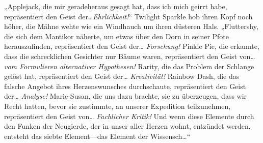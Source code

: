 „Applejack, die mir geradeheraus gesagt hat, dass ich mich geirrt habe, repräsentiert den Geist der…\emph{Ehrlichkeit!}“ Twilight Sparkle hob ihren Kopf noch höher, die Mähne wehte wie ein Windhauch um ihren düsteren Hals. „Fluttershy, die sich dem Mantikor näherte, um etwas über den Dorn in seiner Pfote herauszufinden, repräsentiert den Geist der… \emph{Forschung!} Pinkie Pie, die erkannte, dass die schrecklichen Gesichter nur Bäume waren, repräsentiert den Geist von… \emph{vom Formulieren alternativer Hypothesen!} Rarity, die das Problem der Schlange gelöst hat, repräsentiert den Geist der… \emph{Kreativität!} Rainbow Dash, die das falsche Angebot ihres Herzenswunsches durchschaute, repräsentiert den Geist der… \emph{Analyse!} Marie-Susan, die uns dazu brachte, sie zu überzeugen, dass wir Recht hatten, bevor sie zustimmte, an unserer Expedition teilzunehmen, repräsentiert den Geist von… \emph{Fachlicher Kritik!} Und wenn diese Elemente durch den Funken der Neugierde, der in unser aller Herzen wohnt, entzündet werden, entsteht das siebte Element—das Element der Wissensch…“

